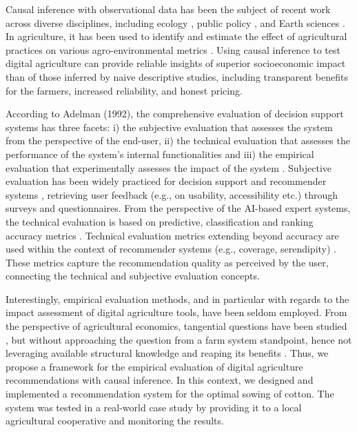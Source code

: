 \documentclass[letterpaper]{article} %
\begin{document}
Causal inference with observational data has been the subject of recent work across diverse disciplines, including
ecology \cite{arif2022utilizing}, public policy \cite{fougere2019causal}, and Earth sciences
\cite{massmann2021causal, runge2019inferring}. In agriculture, it has been used to identify and estimate the effect of agricultural practices on various agro-environmental metrics \cite{qian2016applying, deines2019satellites, giannarakis2022personalizing, giannarakis2022towards}.
Using causal inference to test digital agriculture can provide reliable insights of superior socioeconomic impact than of those inferred by naive descriptive studies, including transparent benefits for the farmers, increased reliability, and honest pricing.


According to Adelman (1992), the comprehensive evaluation of decision support systems has three facets: i) the subjective evaluation that assesses the system from the perspective of the end-user, ii) the technical evaluation that assesses the performance of the system's internal functionalities and iii) the empirical evaluation that experimentally assesses the impact of the system \cite{adelman1992evaluating}. Subjective evaluation has been widely practiced for decision support  \cite{zhai2020decision}  and recommender systems \cite{pu2012evaluating}, retrieving user feedback (e.g., on usability, accessibility etc.) through surveys and questionnaires. From the perspective of the AI-based expert systems, the technical evaluation is based on predictive, classification and ranking accuracy metrics \cite{schroder2011setting}. Technical evaluation metrics extending beyond accuracy are used within the context of recommender systems (e.g., coverage, serendipity) \cite{ge2010beyond}. These metrics capture the recommendation quality as perceived by the user, connecting the technical and subjective evaluation concepts.

Interestingly, empirical evaluation methods, and in particular with regards to the impact assessment of digital agriculture tools, have been seldom employed.
From the perspective of agricultural economics, tangential questions have been studied \cite{muller1974sources, roberts2009estimating, schimmelpfennig2016sequential, mcfadden2022information}, but without approaching the question from a farm system standpoint, hence not leveraging available structural knowledge and reaping its benefits \cite{cinelli_crash_2020}.
Thus, we propose a framework for the empirical evaluation of digital agriculture recommendations with causal inference.
In this context, we designed and implemented a recommendation system for the optimal sowing of cotton. The system was tested in a real-world case study by providing it to a local agricultural cooperative and monitoring the results.
\end{document}
